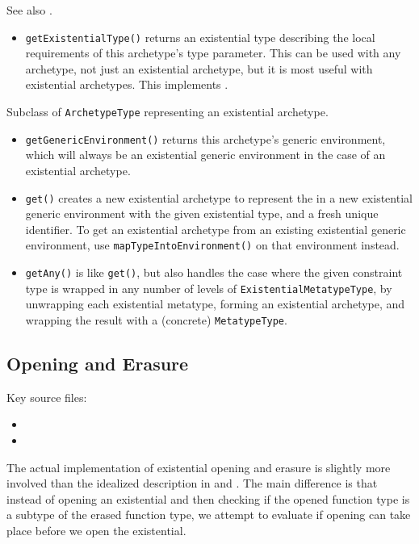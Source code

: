 \documentclass[../generics]{subfiles}
\begin{document}
See also .
\begin{itemize}
\item \texttt{getExistentialType()} returns an existential type describing the local requirements of this archetype's type parameter. This can be used with any archetype, not just an existential archetype, but it is most useful with existential archetypes. This implements .
\end{itemize}

Subclass of \texttt{ArchetypeType} representing an existential archetype.
\begin{itemize}
\item \texttt{getGenericEnvironment()} returns this archetype's generic environment, which will always be an existential generic environment in the case of an existential archetype.
\item \texttt{get()} creates a new existential archetype to represent the  in a new existential generic environment with the given existential type, and a fresh unique identifier. To get an existential archetype from an existing existential generic environment, use \texttt{mapTypeIntoEnvironment()} on that environment instead.
\item \texttt{getAny()} is like \texttt{get()}, but also handles the case where the given constraint type is wrapped in any number of levels of \texttt{ExistentialMetatypeType}, by unwrapping each existential metatype, forming an existential archetype, and wrapping the result with a (concrete) \texttt{MetatypeType}.
\end{itemize}

\subsection*{Opening and Erasure}

Key source files:
\begin{itemize}
\item {}
\item {}
\end{itemize}

The actual implementation of existential opening and erasure is slightly more involved than the idealized description in  and . The main difference is that instead of opening an existential and then checking if the opened function type is a subtype of the erased function type, we attempt to evaluate if opening can take place before we open the existential.
\end{document}
